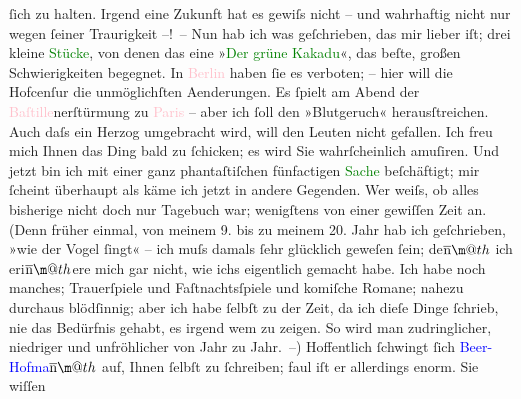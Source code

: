 \documentclass[twoside=false,titlepage=false,open=any, parskip=never, fontsize=12pt, headings=small, chapterprefix=false, appendixprefix=false]{scrbook}
\makeatletter
\newcommand{\pbposition}{\depth}
\newcommand{\pb}{\nobreak\hspace{0pt}\raisebox{-0.1em}{\raisebox{\pbposition}{\textnormal{|}}}\nobreak\hspace{0pt}}
\newcommand*{\geminationn}{$\overline{\hbox{n}}\m@th$}
\makeatother
\begin{document}
                    ſich zu halten. Irgend eine Zukunft hat es gewiſs nicht – und wahrhaftig nicht
                    nur wegen ſeiner Traurigkeit –! – Nun hab ich was geſchrieben, das mir lieber
                    iſt; drei kleine \textcolor{green}{Stücke}{}, von denen das {\pb}eine »\textcolor{green}{Der grüne Kakadu}{}\ledrightnote{\textcolor{green}{Der grüne Kakadu. Groteske in einem Akt}}«, das beſte, großen
                    Schwierigkeiten begegnet. In \textcolor{pink}{Berlin}{}\ledrightnote{\textcolor{pink}{Berlin}} haben ſie
                    es verboten; – hier will die Hofcenſur die unmöglichſten Aenderungen. Es ſpielt
                    am Abend der \textcolor{pink}{Baſtille}{}\ledrightnote{\textcolor{pink}{Bastille}}nerſtürmung zu \textcolor{pink}{Paris}{}\ledrightnote{\textcolor{pink}{Paris}} – aber ich ſoll den »Blutgeruch«
                    herausſtreichen. Auch daſs ein Herzog umgebracht wird, will den Leuten nicht
                    gefallen. Ich freu mich Ihnen das Ding bald zu ſchicken; es wird Sie
                    wahrſcheinlich amuſiren.\pend
           \pstart
           Und jetzt bin ich mit einer ganz phantaſtiſchen {\pb}fünfactigen \textcolor{green}{Sache}{} beſchäftigt; mir ſcheint überhaupt als käme ich
                    jetzt in andere Gegenden. Wer weiſs, ob alles bisherige nicht doch nur Tagebuch
                    war; wenigſtens von einer gewiſſen Zeit an. (Denn früher einmal, von meinem 9.
                    bis zu meinem 20. Jahr hab ich geſchrieben, »wie der Vogel ſingt« – ich muſs
                    damals ſehr glücklich geweſen ſein; de{\geminationn} ich eri{\geminationn}ere mich gar nicht, wie ichs eigentlich gemacht
                    habe. Ich habe noch manches; Trauerſpiele und Faſtnachtsſpiele und {\pb}komiſche Romane; nahezu durchaus blödſinnig;
                    aber ich habe ſelbſt zu der Zeit, da ich dieſe Dinge ſchrieb, nie das Bedürfnis
                    gehabt, es irgend wem zu zeigen. So wird man zudringlicher, niedriger und
                    unfröhlicher von Jahr zu Jahr. –)\pend
           \pstart
           Hoffentlich ſchwingt ſich \textcolor{blue}{Beer-Hofma{\geminationn}}{}\ledrightnote{\textcolor{blue}{Richard Beer-Hofmann}} auf, Ihnen ſelbſt zu ſchreiben; faul iſt er allerdings enorm. Sie wiſſen
\end{document}
